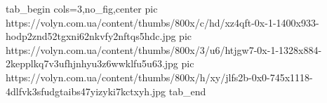  
 
 
 
 


\ifcmt
  tab_begin cols=3,no_fig,center
     pic https://volyn.com.ua/content/thumbs/800x/c/hd/xz4qft-0x-1-1400x933-hodp2znd52tgxni62nkvfy2nftqs5hdc.jpg
     pic https://volyn.com.ua/content/thumbs/800x/3/u6/htjgw7-0x-1-1328x884-2kepplkq7v3ufhjnhyu3z6wwklfu5u63.jpg
     pic https://volyn.com.ua/content/thumbs/800x/h/xy/jlfs2b-0x0-745x1118-4dlfvk3sfudgtaibs47yizyki7kctxyh.jpg
  tab_end
\fi
